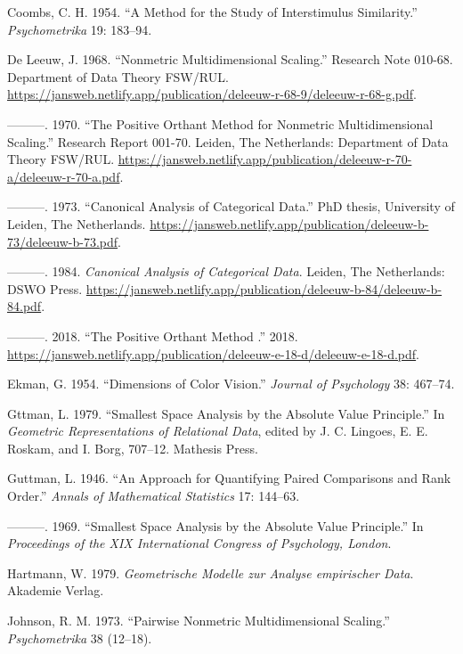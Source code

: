\documentclass[
  12pt,
]{article}
\newlength{\cslhangindent}
\newenvironment{CSLReferences}[2] %
 {\begin{list}{}{%
  \setlength{\itemindent}{0pt}
  \setlength{\leftmargin}{0pt}
  \setlength{\parsep}{0pt}
  \ifodd #1
   \setlength{\leftmargin}{\cslhangindent}
   \setlength{\itemindent}{-1\cslhangindent}
  \fi
  \setlength{\itemsep}{#2\baselineskip}}}
 {\end{list}}
\begin{document}
\label{refs}
\begin{CSLReferences}{1}{0}
Coombs, C. H. 1954. {``A Method for the Study of Interstimulus Similarity.''} \emph{Psychometrika} 19: 183--94.

De Leeuw, J. 1968. {``Nonmetric Multidimensional Scaling.''} Research Note 010-68. Department of Data Theory FSW/RUL. \url{https://jansweb.netlify.app/publication/deleeuw-r-68-9/deleeuw-r-68-g.pdf}.

---------. 1970. {``The Positive Orthant Method for Nonmetric Multidimensional Scaling.''} Research Report 001-70. Leiden, The Netherlands: Department of Data Theory FSW/RUL. \url{https://jansweb.netlify.app/publication/deleeuw-r-70-a/deleeuw-r-70-a.pdf}.

---------. 1973. {``Canonical Analysis of Categorical Data.''} PhD thesis, University of Leiden, The Netherlands. \url{https://jansweb.netlify.app/publication/deleeuw-b-73/deleeuw-b-73.pdf}.

---------. 1984. \emph{Canonical Analysis of Categorical Data}. Leiden, The Netherlands: DSWO Press. \url{https://jansweb.netlify.app/publication/deleeuw-b-84/deleeuw-b-84.pdf}.

---------. 2018. {``{The Positive Orthant Method }.''} 2018. \url{https://jansweb.netlify.app/publication/deleeuw-e-18-d/deleeuw-e-18-d.pdf}.

Ekman, G. 1954. {``{Dimensions of Color Vision}.''} \emph{Journal of Psychology} 38: 467--74.

Gttman, L. 1979. {``Smallest Space Analysis by the Absolute Value Principle.''} In \emph{{Geometric Representations of Relational Data}}, edited by J. C. Lingoes, E. E. Roskam, and I. Borg, 707--12. Mathesis Press.

Guttman, L. 1946. {``{An Approach for Quantifying Paired Comparisons and Rank Order}.''} \emph{Annals of Mathematical Statistics} 17: 144--63.

---------. 1969. {``{Smallest Space Analysis by the Absolute Value Principle}.''} In \emph{{Proceedings of the XIX International Congress of Psychology, London}}.

Hartmann, W. 1979. \emph{{Geometrische Modelle zur Analyse empirischer Data}}. Akademie Verlag.

Johnson, R. M. 1973. {``{Pairwise Nonmetric Multidimensional Scaling}.''} \emph{Psychometrika} 38 (12--18).

\end{CSLReferences}
\end{document}
